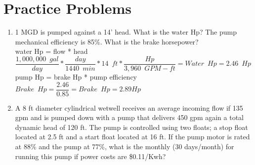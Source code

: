 \section{Practice Problems}

\begin{enumerate}[1.]
\item 1 MGD is pumped against a 14’ head.  What is the water Hp?  The pump mechanical efficiency is 85\%.  What is the brake horsepower?\\
\vspace{0.4cm}
water Hp = flow * head\\
\vspace{0.4cm}
$\dfrac{1,000,000 \enspace gal}{day}*\dfrac{day}{1440 \enspace min}*14 \enspace ft*\dfrac{Hp}{3,960 \enspace GPM-ft}=\boxed{Water \enspace Hp = 2.46 \enspace Hp}$\\
\vspace{0.4cm}
pump Hp = brake Hp * pump efficiency\\
\vspace{0.4cm}
$Brake \enspace Hp = \dfrac{2.46}{0.85}=\boxed{Brake \enspace Hp=2.89Hp}$\\

\vspace{0.4cm}

\item A 8 ft diameter cylindrical wetwell receives an average incoming flow if 135 gpm and is pumped down with a pump that delivers 450 gpm again a total dynamic head of 120 ft.  The pump is controlled using two floats; a stop float located at 2.5 ft and a start float located at 16 ft.  If the pump motor is rated at 88\% and the pump at 77\%, what is the monthly (30 days/month) for running this pump if power costs are \$0.11/Kwh?\\



\end{enumerate}
